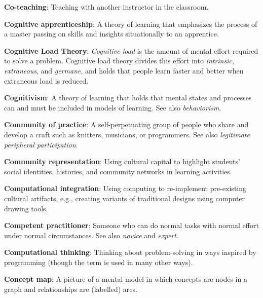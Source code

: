 \textbf{\hypertarget{g:co-teaching}{Co-teaching}\label{g:co-teaching}}: Teaching with another
instructor in the classroom.

\textbf{\hypertarget{g:cognitive-apprenticeship}{Cognitive apprenticeship}\label{g:cognitive-apprenticeship}}: A
theory of learning that emphasizes the process of a master passing on
skills and insights situationally to an apprentice.

\textbf{\hypertarget{g:cognitive-load-theory}{Cognitive Load Theory}\label{g:cognitive-load-theory}}: \emph{Cognitive
load} is the amount of mental effort required to solve a problem.
Cognitive load theory divides this effort into \emph{intrinsic},
\emph{extraneous}, and \emph{germane}, and holds that people learn faster and
better when extraneous load is reduced.

\textbf{\hypertarget{g:cognitivism}{Cognitivism}\label{g:cognitivism}}: A theory of learning that holds
that mental states and processes can and must be included in models of
learning. See also \emph{behaviorism}.

\textbf{\hypertarget{g:community-of-practice}{Community of practice}\label{g:community-of-practice}}: A
self-perpetuating group of people who share and develop a craft such as
knitters, musicians, or programmers. See also \emph{legitimate peripheral
participation}.

\textbf{\hypertarget{g:community-representation}{Community representation}\label{g:community-representation}}: Using
cultural capital to highlight students' social identities, histories,
and community networks in learning activities.

\textbf{\hypertarget{g:computational-integration}{Computational integration}\label{g:computational-integration}}:
Using computing to re-implement pre-existing cultural artifacts, e.g.,
creating variants of traditional designs using computer drawing tools.

\textbf{\hypertarget{g:competent-practitioner}{Competent practitioner}\label{g:competent-practitioner}}: Someone
who can do normal tasks with normal effort under normal circumstances.
See also \emph{novice} and \emph{expert}.

\textbf{\hypertarget{g:computational-thinking}{Computational thinking}\label{g:computational-thinking}}: Thinking
about problem-solving in ways inspired by programming (though the term
is used in many other ways).

\textbf{\hypertarget{g:concept-map}{Concept map}\label{g:concept-map}}: A picture of a mental model in
which concepts are nodes in a graph and relationships are (labelled)
arcs.

